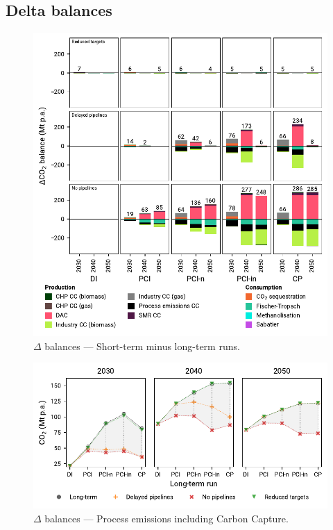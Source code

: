 \documentclass[preprint,12pt,sort&compress]{elsarticle}
\begin{document}
\subsection{Delta balances}
\begin{figure}[htbp]
  \centering
  \includegraphics[width=\textwidth]{balances_overview_extended_co2 stored}
  \caption{$\Delta$ balances --- Short-term minus long-term runs.}
  \label{fig:balances_overview_extended_co2_stored}
\end{figure}
\begin{figure}[htbp]
  \centering
  \includegraphics[width=\textwidth]{delta_balances_process emissions CC}
  \caption{$\Delta$ balances --- Process emissions including Carbon Capture.}
  \label{fig:delta_balances_process_emissions_CC}
\end{figure}
\end{document}

